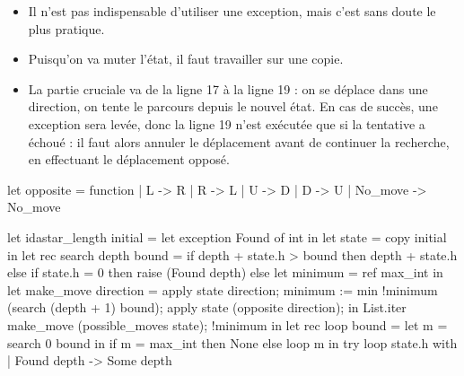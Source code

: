 \begin{ques}
  \begin{itemize}
    \item Il n'est pas indispensable d'utiliser une exception,
          mais c'est sans doute le plus pratique.
    \item Puisqu'on va muter l'état, il faut travailler sur une
          copie.
    \item La partie cruciale va de la ligne 17 à la ligne 19 :
          on se déplace dans une direction, on tente le parcours
          depuis le nouvel état. En cas de succès, une exception
          sera levée, donc la ligne 19 n'est exécutée que si
          la tentative a échoué : il faut alors annuler le
          déplacement avant de continuer la recherche, en
          effectuant le déplacement opposé.
  \end{itemize}
\begin{ocaml}[linenos]
let opposite = function
  | L -> R
  | R -> L
  | U -> D
  | D -> U
  | No_move -> No_move

let idastar_length initial =
  let exception Found of int in
  let state = copy initial in
  let rec search depth bound =
    if depth + state.h > bound then depth + state.h
    else if state.h = 0 then raise (Found depth)
    else
      let minimum = ref max_int in
      let make_move direction =
          apply state direction;
          minimum := min !minimum (search (depth + 1) bound);
          apply state (opposite direction); in
      List.iter make_move (possible_moves state);
      !minimum in
  let rec loop bound =
    let m = search 0 bound in
    if m = max_int then None
    else loop m in
  try
    loop state.h
  with
  | Found depth -> Some depth
\end{ocaml}
\end{ques}

